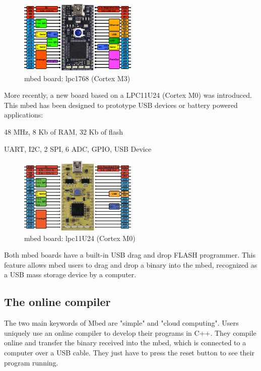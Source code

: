 \documentclass[pdftex,10pt,a4paper]{report}
\newenvironment{packed_item}{
\begin{itemize}
  \setlength{\itemsep}{1pt}
  \setlength{\parskip}{0pt}
  \setlength{\parsep}{0pt}
}{\end{itemize}}
\begin{document}
\begin{figure}[h!]
\centering
\includegraphics[width=0.5\textwidth]{./lpc1768.png}
\caption{mbed board: lpc1768 (Cortex M3)}
\label{mbed_board: lpc1768 (Cortex M3)}
\end{figure}


More recently, a new board based on a LPC11U24 (Cortex M0) was introduced. This mbed has been designed to prototype USB devices or battery powered applications:
\begin{packed_item}
	\item 48 MHz, 8 Kb of RAM, 32 Kb of flash
	\item UART, I2C, 2 SPI, 6 ADC, GPIO, USB Device
\end{packed_item}

\begin{figure}[h!]
\centering
\includegraphics[width=0.5\textwidth]{./lpc11U24.png}
\caption{mbed board: lpc11U24 (Cortex M0)}
\label{mbed_board: lpc11U24 (Cortex M0)}
\end{figure}


Both mbed boards have a built-in USB drag and drop FLASH programmer. This feature allows mbed users to drag and drop a binary into the mbed, recognized as a USB mass storage device by a computer.


\subsection{The online compiler}
The two main keywords of Mbed are "simple" and "cloud computing". Users uniquely use an online compiler to develop their programs in C++. They compile online and transfer the binary received into the mbed, which is connected to a computer over a USB cable. They just have to press the reset button to see their program running.
\\
\end{document}
